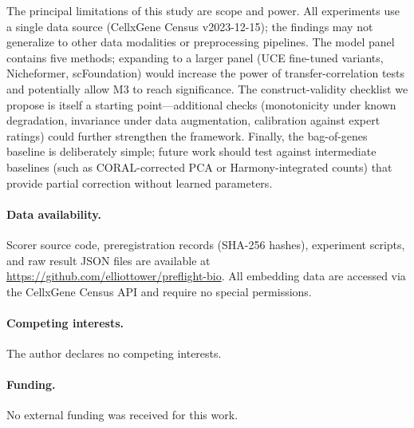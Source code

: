 \documentclass[9pt,lineno]{elife}
\begin{document}
The principal limitations of this study are scope and power. All experiments use a single data source (CellxGene Census v2023-12-15); the findings may not generalize to other data modalities or preprocessing pipelines. The model panel contains five methods; expanding to a larger panel (UCE fine-tuned variants, Nicheformer, scFoundation) would increase the power of transfer-correlation tests and potentially allow M3 to reach significance. The construct-validity checklist we propose is itself a starting point---additional checks (monotonicity under known degradation, invariance under data augmentation, calibration against expert ratings) could further strengthen the framework. Finally, the bag-of-genes baseline is deliberately simple; future work should test against intermediate baselines (such as CORAL-corrected PCA or Harmony-integrated counts) that provide partial correction without learned parameters.

\paragraph{Data availability.} Scorer source code, preregistration records (SHA-256 hashes), experiment scripts, and raw result JSON files are available at \url{https://github.com/elliottower/preflight-bio}. All embedding data are accessed via the CellxGene Census API and require no special permissions.

\paragraph{Competing interests.} The author declares no competing interests.

\paragraph{Funding.} No external funding was received for this work.


\end{document}
